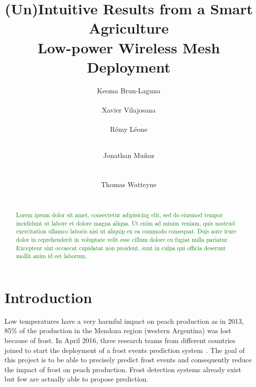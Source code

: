 \documentclass{sig-alternate}
\newcommand{\lorem}               {\textcolor{green}{Lorem ipsum dolor sit amet, consectetur adipisicing elit, sed do eiusmod tempor incididunt ut labore et dolore magna aliqua. Ut enim ad minim veniam, quis nostrud exercitation ullamco laboris nisi ut aliquip ex ea commodo consequat. Duis aute irure dolor in reprehenderit in voluptate velit esse cillum dolore eu fugiat nulla pariatur. Excepteur sint occaecat cupidatat non proident, sunt in culpa qui officia deserunt mollit anim id est laborum.}}
\begin{document}
\title{(Un)Intuitive Results from a Smart Agriculture\\Low-power Wireless Mesh Deployment}

\author{
  \alignauthor Keoma Brun-Laguna\\
    \\
  \alignauthor Xavier Vilajosana\\
    \\
  \alignauthor Rémy Léone\\
    \\
  \and
  \alignauthor Jonathan Muñoz\\
    \\
    \\
  \alignauthor Thomas Watteyne\\
    \\
}

\maketitle

\begin{abstract}
\lorem
\end{abstract}

\section{Introduction}
\label{sec:intro}


Low temperatures have a very harmful impact on peach production as in 2013, 85\% of the production in the Mendoza region (western Argentina) was lost because of frost.
In April 2016, three research teams from different countries joined to start the deployment of a frost events prediction system~\cite{watteyne16peach}.
The goal of this project is to be able to precisely predict frost events and consequently reduce the impact of frost on peach production.
Frost detection systems already exist but few are actually able to propose prediction.
\end{document}
